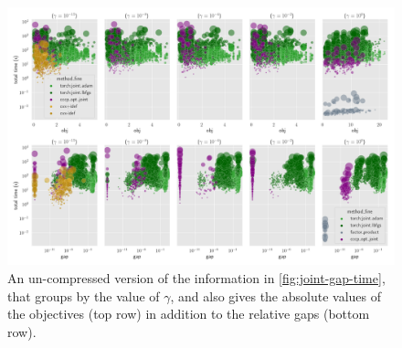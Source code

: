 \begin{subappendices}
\begin{figure}
    \includegraphics[height=0.45\textheight]{figs/rand-joint/gap-vs-time-by-gamma}
    \caption[A disaggregated version of \cref*{fig:joint-gap-time}]{\small
        An un-compressed version of the information in \cref{fig:joint-gap-time}, that groups by the value of $\gamma$, and also gives the absolute values of the objectives (top row) in addition to the relative gaps (bottom row).
    }\label{fig:joint-gap-vs-time-by-gamma}
\end{figure}





\end{subappendices}
